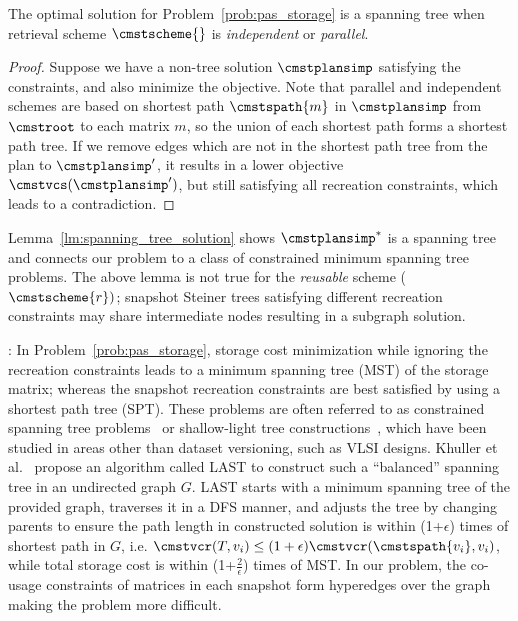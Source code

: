 \documentclass[conference]{IEEEtran}
\begin{document}
\begin{lemma}\label{lm:spanning_tree_solution}
The optimal solution for Problem~\ref{prob:pas_storage} is a spanning tree when retrieval scheme $\cmstscheme{}$ is \emph{independent} or \emph{parallel}.
\end{lemma}
\begin{proof}
Suppose we have a non-tree solution $\cmstplansimp$ satisfying the constraints, and also minimize the objective. Note that parallel and independent schemes are based on shortest path $\cmstspath{m}$ in $\cmstplansimp$ from $\cmstroot$ to each matrix $m$, so the union of each shortest path forms a shortest path tree. If we remove edges which are not in the shortest path tree from the plan to $\cmstplansimp'$, it results in a lower objective $\cmstvcs(\cmstplansimp')$, but still satisfying all recreation constraints, which leads to a contradiction.
\end{proof}
Lemma~\ref{lm:spanning_tree_solution} shows $\cmstplansimp^*$ is a spanning tree and connects our problem to a class of constrained minimum spanning tree problems. 
The above lemma is not true for the \emph{reusable} scheme ($\cmstscheme{r})$; snapshot Steiner trees satisfying different recreation constraints may share intermediate nodes resulting in a subgraph solution. 



:
In Problem~\ref{prob:pas_storage}, storage cost minimization while ignoring the recreation constraints 
leads to a minimum spanning tree (MST) of the storage matrix; whereas the snapshot recreation
constraints are best satisfied by using a shortest path tree (SPT). %
These problems are often referred to as
constrained spanning tree problems~\cite{deo1997computation} or shallow-light
tree constructions~\cite{vlsi1994optimal}, which have been studied in areas
other than dataset versioning, such as VLSI designs. 
Khuller et al.~\cite{khuller1995balancing} propose an algorithm called LAST to construct 
such a ``balanced'' spanning tree in an undirected graph $G$. LAST starts with a minimum spanning tree of the provided graph, 
traverses it in a DFS manner, and adjusts the tree by changing parents to ensure the path length in constructed
solution is within (1+$\epsilon$) times of shortest path in $G$, i.e.
$\cmstvcr(T,v_i) \leq (1+\epsilon)\cmstvcr(\cmstspath{v_i}, v_i)$, while total
storage cost is within (1+$\frac{2}{\epsilon}$) times of MST. In our problem,
the co-usage constraints of matrices in each snapshot form hyperedges over the
graph making the problem more difficult. %
\end{document}

